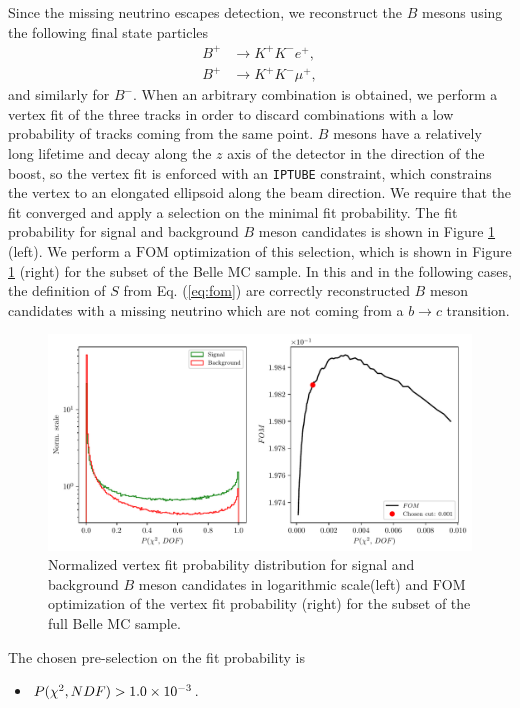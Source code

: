Since the missing neutrino escapes detection, we reconstruct the $B$ mesons using the following final state particles
\begin{align*}
B^+ &\to K^+ K^- e^+, \\
B^+ &\to K^+ K^- \mu^+,
\end{align*}
and similarly for $B^-$. When an arbitrary combination is obtained, we perform a vertex fit of the three tracks in order to discard combinations with a low probability of tracks coming from the same point. $B$ mesons have a relatively long lifetime and decay along the $z$ axis of the detector in the direction of the boost, so the vertex fit is enforced with an \texttt{IPTUBE} constraint, which constrains the vertex to an elongated ellipsoid along the beam direction. We require that the fit converged and apply a selection on the minimal fit probability. The fit probability for signal and background $B$ meson candidates is shown in Figure \ref{fig:vtx} (left). We perform a $\mathrm{FOM}$ optimization of this selection, which is shown in Figure \ref{fig:vtx} (right) for the subset of the Belle MC sample. In this and in the following cases, the definition of $S$ from Eq. (\ref{eq:fom}) are correctly reconstructed $B$ meson candidates with a missing neutrino which are not coming from a $b \to c$ transition.

\begin{figure}[H]
	\centering
	\captionsetup{width=0.8\linewidth}
	\includegraphics[width=\linewidth]{fig/VTX}
	\caption{Normalized vertex fit probability distribution for signal and background $B$ meson candidates in logarithmic scale(left) and $\mathrm{FOM}$ optimization of the vertex fit probability (right) for the subset of the full Belle MC sample.}
	\label{fig:vtx}
\end{figure}

The chosen pre-selection on the fit probability is
\begin{itemize}
	\item $P(\chi^2,NDF) > 1.0\times 10^{-3}$.

\end{itemize}


